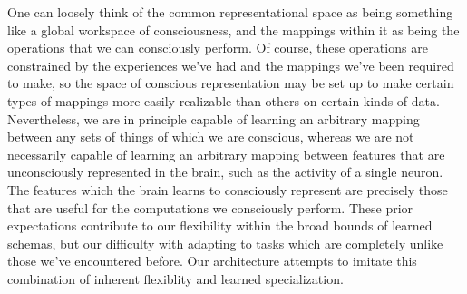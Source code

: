 \documentclass[11pt]{article}
\begin{document}
One can loosely think of the common representational space as being something like a global workspace of consciousness, and the mappings within it as being the operations that we can consciously perform. Of course, these operations are constrained by the experiences we've had and the mappings we've been required to make, so the space of conscious representation may be set up to make certain types of mappings more easily realizable than others on certain kinds of data. Nevertheless, we are in principle capable of learning an arbitrary mapping between any sets of things of which we are conscious, whereas we are not necessarily capable of learning an arbitrary mapping between features that are unconsciously represented in the brain, such as the activity of a single neuron. The features which the brain learns to consciously represent are precisely those that are useful for the computations we consciously perform. These prior expectations contribute to our flexibility within the broad bounds of learned schemas, but our difficulty with adapting to tasks which are completely unlike those we've encountered before. Our architecture attempts to imitate this combination of inherent flexiblity and learned specialization. \par  
\end{document}
